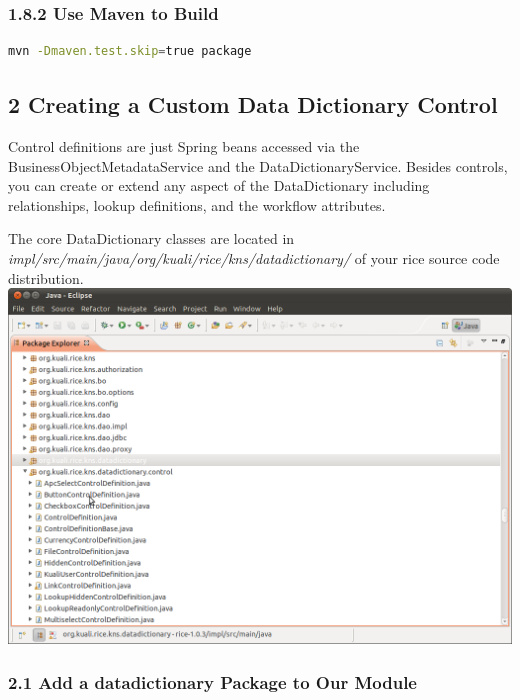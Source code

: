 \subsubsection*{1.8.2 Use Maven to Build}
\begin{lstlisting}[basicstyle=\scriptsize,language=bash,backgroundcolor=\color{ubergray},caption={Maven
  Execution},frame=single,breaklines=true]
mvn -Dmaven.test.skip=true package

\end{lstlisting}


\subsection*{2 Creating a Custom Data Dictionary Control}
Control definitions are just Spring beans accessed via the
BusinessObjectMetadataService and the DataDictionaryService. Besides
controls, you can create or extend any aspect of the DataDictionary
including relationships, lookup definitions, and the workflow
attributes.

The core DataDictionary classes are located in
\emph{impl/src/main/java/org/kuali/rice/kns/datadictionary/} of your
rice source code distribution.
\includegraphics[width=\textwidth]{images/Screenshot-Java - Eclipse .png}

\subsubsection*{2.1 Add a datadictionary Package to Our Module}

